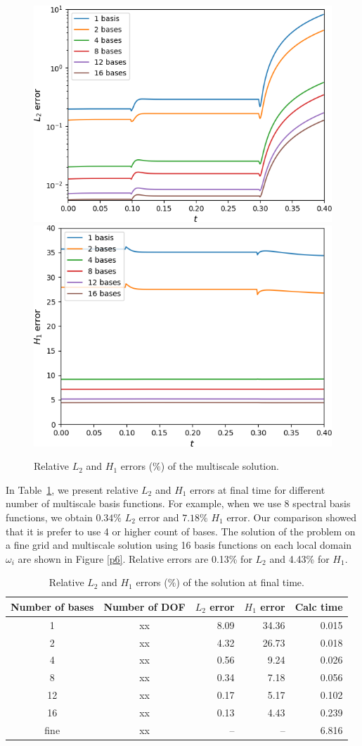 \documentclass[runningheads]{llncs}
\begin{document}
\begin{figure}[h!]
\centering
\includegraphics[width=0.45\linewidth]{L2_log.png} 
\hspace{2em}
\includegraphics[width=0.45\linewidth]{H1.png} 
\caption{Relative $L_2$ and $H_1$ errors ($\%$) of the multiscale solution.}
\label{p5}
\end{figure} 

In Table~\ref{t2}, we present relative $L_2$ and $H_1$ errors at final time for different number of multiscale basis functions.
For example, when we use 8 spectral basis functions, we obtain $0.34\%$ $L_2$ error and $7.18\%$ $H_1$ error. 
Our comparison showed that it is prefer to use 4 or higher count of bases. 
The solution of the problem on a fine grid and multiscale solution using 16 basis functions on each local domain $\omega_i$ are shown in Figure \ref{p6}. Relative errors are 0.13\% for $L_2$ and 4.43\% for $H_1$. 

\begin{table}[h!]
\caption{Relative $L_2$ and $H_1$ errors ($\%$) of the solution at final time.}
\label{t2}
\begin{center}
\begin{tabular}{|c|c|r|r|r|}
\hline
Number of bases & Number of DOF & $L_2$ error & $H_1$ error & Calc time\\
\hline
1 & xx & 8.09 & 34.36 & 0.015 \\
2 & xx & 4.32 & 26.73 & 0.018 \\
4 & xx & 0.56 & 9.24 & 0.026 \\
8 & xx & 0.34 & 7.18 & 0.056 \\
12 & xx & 0.17 & 5.17 & 0.102 \\
16 & xx & 0.13 & 4.43 & 0.239 \\
fine & xx & -- & -- & 6.816 \\
\hline
\end{tabular}
\end{center}
\end{table}
\end{document}
